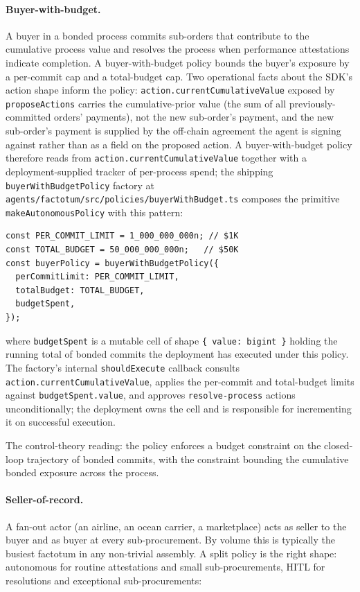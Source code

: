 \documentclass[11pt,a4paper]{article}
\theoremstyle{definition}
\theoremstyle{remark}
\begin{document}
\paragraph{Buyer-with-budget.}
A buyer in a bonded process commits sub-orders that contribute to
the cumulative process value and resolves the process when
performance attestations indicate completion. A buyer-with-budget
policy bounds the buyer's exposure by a per-commit cap and a
total-budget cap. Two operational facts about the SDK's action
shape inform the policy: \texttt{action.currentCumulativeValue}
exposed by \texttt{proposeActions} carries the cumulative-prior
value (the sum of all previously-committed orders' payments),
not the new sub-order's payment, and the new sub-order's payment
is supplied by the off-chain agreement the agent is signing
against rather than as a field on the proposed action. A
buyer-with-budget policy therefore reads from
\texttt{action.currentCumulativeValue} together with a
deployment-supplied tracker of per-process spend; the shipping
\texttt{buyerWithBudgetPolicy} factory at
\texttt{agents/factotum/src/policies/buyerWithBudget.ts} composes
the primitive \texttt{makeAutonomousPolicy} with this pattern:

\begin{lstlisting}
const PER_COMMIT_LIMIT = 1_000_000_000n; // $1K
const TOTAL_BUDGET = 50_000_000_000n;   // $50K
const buyerPolicy = buyerWithBudgetPolicy({
  perCommitLimit: PER_COMMIT_LIMIT,
  totalBudget: TOTAL_BUDGET,
  budgetSpent,
});
\end{lstlisting}

\noindent
where \texttt{budgetSpent} is a mutable cell of shape
\texttt{\{ value: bigint \}} holding the running total of bonded
commits the deployment has executed under this policy. The
factory's internal \texttt{shouldExecute} callback consults
\texttt{action.currentCumulativeValue}, applies the per-commit and
total-budget limits against \texttt{budgetSpent.value}, and
approves \texttt{resolve-process} actions unconditionally; the
deployment owns the cell and is responsible for incrementing it on
successful execution.

The control-theory reading: the policy enforces a budget
constraint on the closed-loop trajectory of bonded commits, with
the constraint bounding the cumulative bonded exposure across the
process.

\paragraph{Seller-of-record.}
A fan-out actor (an airline, an ocean carrier, a marketplace)
acts as seller to the buyer and as buyer at every sub-procurement.
By volume this is typically the busiest factotum in any non-trivial
assembly. A split policy is the right shape: autonomous for routine
attestations and small sub-procurements, HITL for resolutions and
exceptional sub-procurements:
\end{document}
